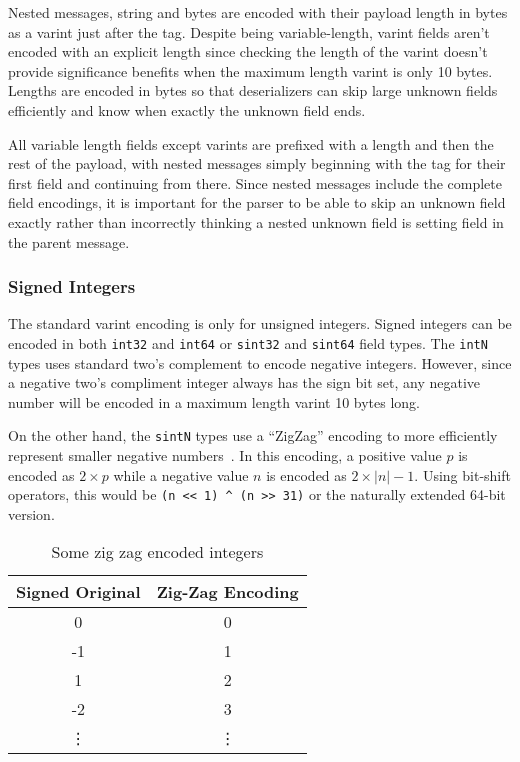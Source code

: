 \documentclass[11pt]{article}
\theoremstyle{definition}
\theoremstyle{plain}
\begin{document}
Nested messages, string and bytes are encoded with their payload length in bytes
as a varint just after the tag. Despite being variable-length, varint fields
aren't encoded with an explicit length since checking the length of the varint
doesn't provide significance benefits when the maximum length varint is only 10
bytes. Lengths are encoded in bytes so that deserializers can skip large unknown
fields efficiently and know when exactly the unknown field ends.

All variable length fields except varints are prefixed with a length and then
the rest of the payload, with nested messages simply beginning with the tag for
their first field and continuing from there. Since nested messages include the
complete field encodings, it is important for the parser to be able to skip an
unknown field exactly rather than incorrectly thinking a nested unknown field is
setting field in the parent message.

\subsubsection{Signed Integers}

The standard varint encoding is only for unsigned integers. Signed integers can
be encoded in both \texttt{int32} and \texttt{int64} or \texttt{sint32} and
\texttt{sint64} field types. The \texttt{intN} types uses standard two's
complement to encode negative integers. However, since a negative two's
compliment integer always has the sign bit set, any negative number will be
encoded in a maximum length varint 10 bytes long.

On the other hand, the \texttt{sintN} types use a ``ZigZag'' encoding to more
efficiently represent smaller negative numbers~\cite{Encoding}. In this
encoding, a positive value $p$ is encoded as $2 \times p$ while a negative value $n$
is encoded as $2 \times |n| - 1$. Using bit-shift operators, this would be
\verb|(n << 1) ^ (n >> 31)| or the naturally extended 64-bit version.

\begin{table}[htbp]
  \centering
  \begin{tabular}{cc}
    \toprule
    Signed Original & Zig-Zag Encoding \\
    \midrule
    0 & 0 \\
    -1 & 1 \\
    1 & 2 \\
    -2 & 3 \\
    \vdots & \vdots \\
    \bottomrule
  \end{tabular}
\caption{Some zig zag encoded integers}
\label{tab:zigzag}
\end{table}
\end{document}
